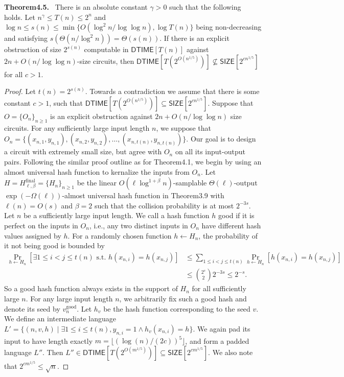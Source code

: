 \documentclass[10pt,a4paper]{article}
\newenvironment{authorclaim}[1]{\par\medskip\noindent\textbf{#1.}\ }{\par\medskip}
\begin{document}
\begin{authorclaim}{Theorem4.5}
There is an absolute constant $\gamma>0$ such that the following holds. Let $n^\gamma\le T(n)\le2^n$ and $\log n\le s(n)\le\min\{O(\log^2n/\log\log n),\log T(n)\}$ being non-decreasing and satisfying $s(\Theta(n/\log^2n))=\Theta(s(n))$. If there is an explicit obstruction of size $2^{s(n)}$ computable in $\mathsf{DTIME}[T(n)]$ against $2n+O(n/\log\log n)$-size circuits, then $\mathsf{DTIME}[T(2^{O(n^{1/5})})]\not\subseteq\mathsf{SIZE}[2^{cn^{1/5}}]$ for all $c>1$.
\end{authorclaim}

\begin{proof}
Let $t(n)=2^{s(n)}$. Towards a contradiction we assume that there is some constant $c>1$, such that $\mathsf{DTIME}[T(2^{O(n^{1/5})})]\subseteq\mathsf{SIZE}[2^{cn^{1/5}}]$. Suppose that $O=\{O_n\}_{n\ge1}$ is an explicit obstruction against $2n+O(n/\log\log n)$ size circuits. For any sufficiently large input length $n$, we suppose that $O_n=\{(x_{n,1},y_{n,1}),(x_{n,2},y_{n,2}),\ldots,(x_{n,t(n)},y_{n,t(n)})\}$. Our goal is to design a circuit with extremely small size, but agree with $O_n$ on all its input-output pairs. Following the similar proof outline as for Theorem4.1, we begin by using an almost universal hash function to kernalize the inputs from $O_n$.
Let $H=H^{\mathrm{final}}_{\ell,\beta}=\{H_n\}_{n\ge1}$ be the linear $O(\ell\log^{1+\beta}n)$-samplable $\Theta(\ell)$-output $\exp(-\Omega(\ell))$-almost universal hash function in Theorem3.9 with $\ell(n)=O(s)$ and $\beta=2$ such that the collision probability is at most $2^{-3s}$. Let $n$ be a sufficiently large input length. We call a hash function $h$ good if it is perfect on the inputs in $O_n$, i.e., any two distinct inputs in $O_n$ have different hash values assigned by $h$. For a randomly chosen function $h\leftarrow H_n$, the probability of it not being good is bounded by
\begin{align*}
\Pr_{h\leftarrow H_n}[\exists1\le i<j\le t(n)\text{ s.t. }h(x_{n,i})=h(x_{n,j})]
&\le\sum_{1\le i<j\le t(n)}\Pr_{h\leftarrow H_n}[h(x_{n,i})=h(x_{n,j})]\\
&\le\binom{2^s}2 2^{-3s}\le2^{-s}.
\end{align*}
So a good hash function always exists in the support of $H_n$ for all sufficiently large $n$. For any large input length $n$, we arbitrarily fix such a good hash and denote its seed by $v_n^{\mathrm{good}}$.
Let $h_v$ be the hash function corresponding to the seed $v$. We define an intermediate language $L'=\{(n,v,h)\mid\exists1\le i\le t(n),y_{n,i}=1\wedge h_v(x_{n,i})=h\}$. We again pad its input to have length exactly $m=\lfloor(\log(n)/(2c))^5\rfloor$, and form a padded language $L''$. Then $L''\in\mathsf{DTIME}[T(2^{O(m^{1/5})})]\subseteq\mathsf{SIZE}[2^{cm^{1/5}}]$. We also note that $2^{cm^{1/5}}\le\sqrt n$.

\end{proof}
\end{document}
